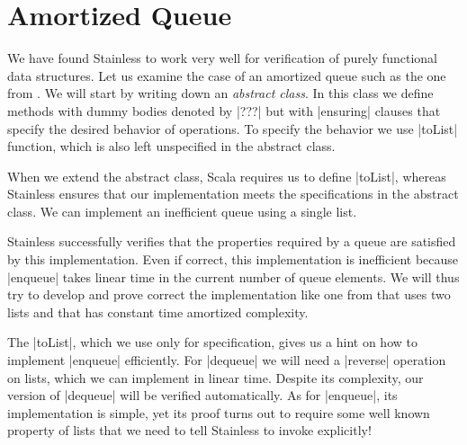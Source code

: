 \section{Amortized Queue}

We have found Stainless to work very well for verification of purely functional data structures.
Let us examine the case of an amortized queue such as the one from \cite[Section 5.2, Page 42]{Okasaki98PurelyFunctionalDataStructures}.
We will start by writing down an \emph{abstract class}. In this class we define methods with dummy bodies denoted by |???|
but with |ensuring| clauses that specify the desired behavior of operations. To specify the behavior we use |toList| function,
which is also left unspecified in the abstract class.

When we extend the abstract class, Scala requires us to define |toList|, whereas Stainless ensures that our implementation
meets the specifications in the abstract class. We can implement an inefficient queue using a single list.

Stainless successfully verifies that the properties required by a queue are satisfied by this implementation.
Even if correct, this implementation is inefficient because |enqueue| takes linear time in the current number of queue elements.
We will thus try to develop and prove correct the implementation like one from \cite[Section 5.2, Page 42]{Okasaki98PurelyFunctionalDataStructures} that uses two lists and that has constant time amortized complexity.

The |toList|, which we use only for specification, gives us a hint on how to implement |enqueue| efficiently.
For |dequeue| we will need a |reverse| operation on lists, which we can implement in linear time.
Despite its complexity, our version of |dequeue| will be verified automatically.
As for |enqueue|, its implementation is simple, yet its proof turns out to require some well known property
of lists that we need to tell Stainless to invoke explicitly!




